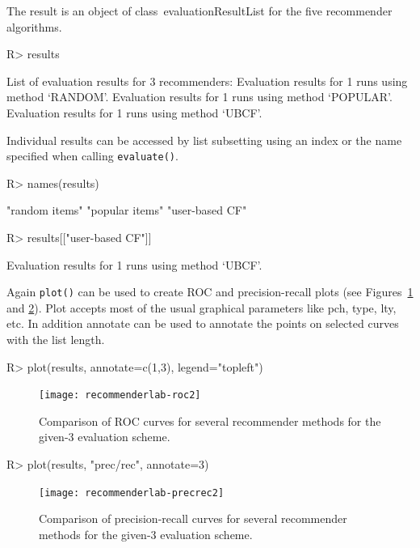 \documentclass[nojss]{jss}
\newcommand{\class}[1]{\mbox{\textsf{#1}}}
\newcommand{\func}[1]{\mbox{\texttt{#1()}}}
\begin{document}
The result is an object of class~\class{evaluationResultList} for the
five recommender algorithms.
\begin{Schunk}
\begin{Sinput}
R> results
\end{Sinput}
\begin{Soutput}
List of evaluation results for 3 recommenders:
Evaluation results for 1 runs using method ‘RANDOM’.
Evaluation results for 1 runs using method ‘POPULAR’.
Evaluation results for 1 runs using method ‘UBCF’.
\end{Soutput}
\end{Schunk}

Individual results can be accessed by list subsetting using an index or 
the name specified when calling \func{evaluate}.

\begin{Schunk}
\begin{Sinput}
R> names(results)
\end{Sinput}
\begin{Soutput}
[1] "random items"  "popular items" "user-based CF"
\end{Soutput}
\begin{Sinput}
R> results[["user-based CF"]]
\end{Sinput}
\begin{Soutput}
Evaluation results for 1 runs using method ‘UBCF’.
\end{Soutput}
\end{Schunk}


Again \func{plot} can be used to create ROC and precision-recall plots
(see Figures~\ref{fig:roc2} and \ref{fig:precrec2}). Plot accepts most
of the usual graphical parameters like pch, type, lty, etc. In addition
annotate can be used to annotate the points on selected curves with the 
list length.

\begin{Schunk}
\begin{Sinput}
R> plot(results, annotate=c(1,3), legend="topleft")
\end{Sinput}
\end{Schunk}
\begin{figure}
\centerline{\texttt{[image: recommenderlab-roc2]}}
\caption{Comparison of ROC curves for several recommender methods for the 
given-3 evaluation scheme.}
\label{fig:roc2}
\end{figure}

\begin{Schunk}
\begin{Sinput}
R> plot(results, "prec/rec", annotate=3)
\end{Sinput}
\end{Schunk}
\begin{figure}
\centerline{\texttt{[image: recommenderlab-precrec2]}}
\caption{Comparison of precision-recall curves 
for several recommender methods for the 
    given-3 evaluation scheme.}
\label{fig:precrec2}
\end{figure}
\end{document}
